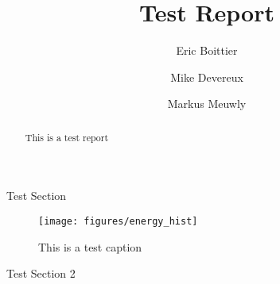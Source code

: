 \documentclass[journal=jacsat,manuscript=article]{achemso}
\author{Eric Boittier}
\author{Mike Devereux}
\author{Markus Meuwly}
\affiliation[University of Basel]
{Department of Chemistry, University of Basel, Switzerland}
\title[ Test Report ] { Test Report }
\begin{document}
\begin{abstract}
This is a test report
\end{abstract}

Test Section

\begin{figure}
    \centering
    \texttt{[image: figures/energy\_hist]}
    \caption{ This is a test caption }
    \label{fig:testlabel}
\end{figure}
Test Section 2
\end{document}
